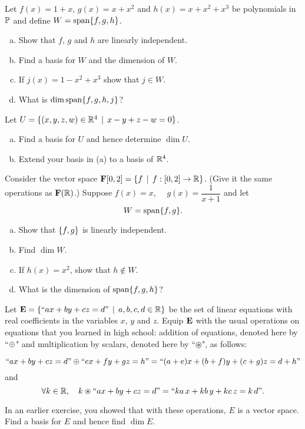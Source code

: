 \begin{prob}
\end{prob} \begin{prob} \label{prob09.3}
Let  $f(x) =1+x$, $g(x) = x+ x^2$ and $h(x) = x+ x^2 + x^3$ be  polynomials in $\mathbb{P}$ and  define
$W=\textrm{span}\{f,g,h\}$.
\smallskip
\begin{enumerate}[a)]
\item  Show that $f$, $g$ and $h$ are
linearly independent. 
\item Find a basis for $W$ and the dimension of $W$.
\smallskip
\item If $j(x) = 1-x^2 +x^3$  show that $j \in
W$.
\item What is $\dim \textrm{span}\{f,g,h,j\}$?
\end{enumerate}
\end{prob} \begin{prob} \label{prob09.4} Let $U=\{(x,y,z,w) \in \mathbb{R}^4 \,\mid \, x-y+z-w=0 \}$.\medskip
\begin{enumerate}[a)]
\item Find   a basis for $U$ and hence determine $\dim U$.


\item  Extend your basis in (a) to a basis of $\mathbb{R}^4$. 
\end{enumerate}
 

\end{prob} \begin{prob} \label{prob09.5} Consider  the vector space
$ \mathbf{F}[0,2]=\{f \,\mid \, f: [0,2] \to \mathbb{R} \}$. (Give it the same operations as $\mathbf{F}(\mathbb{R})$.) Suppose $f(x)= x$,  
$\quad g(x)=\dfrac1{x+1}$ and let $$W=\textrm{span}\{f,g\}.$$

\begin{enumerate}[a)]
\item Show that $\{f,g \}$ is linearly independent. 
\item  Find $\dim
W$.
\item  If $h(x)=x^2$, show that $h\notin W$. 
\item  What is the dimension of  $\textrm{span}\{f,g,h\}$?
\end{enumerate}


\end{prob} \begin{prob} \label{prob09.6} Let  $\mathbf{E}=\{``ax+by+ cz=d"\,\mid \, a,b,c, d\in\mathbb{R} \}$ be the set of linear equations with real coefficients in the variables $x$, $y$ and $z$. Equip $\mathbf{E}$ with the usual operations on equations that you learned in high school: addition of equations, denoted here by ``$\oplus$" and multiplication by scalars, denoted here by ``$\circledast$", as follows: 

$$``ax+by+ cz=d" \oplus ``ex+fy+gz=h" =``(a+e)x + (b+f)y + (c+g)z=d+h"$$and
$$ \forall   k\in \mathbb{R},\quad    k\circledast``ax+by+ cz=d" = `` ka\, x+ kb \,y+ kc \,z = k\,d".$$

In an earlier exercise, you showed that with these operations, $E$ is a vector space. Find a basis for $E$ and hence find $ \dim E$.
\end{prob}
